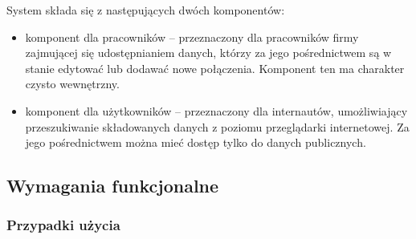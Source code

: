 \documentclass[10pt,a4paper]{article}
\begin{document}
System składa się z następujących dwóch komponentów:
\begin{itemize}
	\item komponent dla pracowników -- przeznaczony dla pracowników firmy zajmującej się udostępnianiem danych, którzy za jego pośrednictwem są w stanie edytować lub dodawać nowe połączenia. Komponent ten ma charakter czysto wewnętrzny.
	\item komponent dla użytkowników -- przeznaczony dla internautów, umożliwiający przeszukiwanie składowanych danych z poziomu przeglądarki internetowej. Za jego pośrednictwem można mieć dostęp tylko do danych publicznych.
\end{itemize}

\subsection{Wymagania funkcjonalne}

\subsubsection*{Przypadki użycia}
\end{document}
